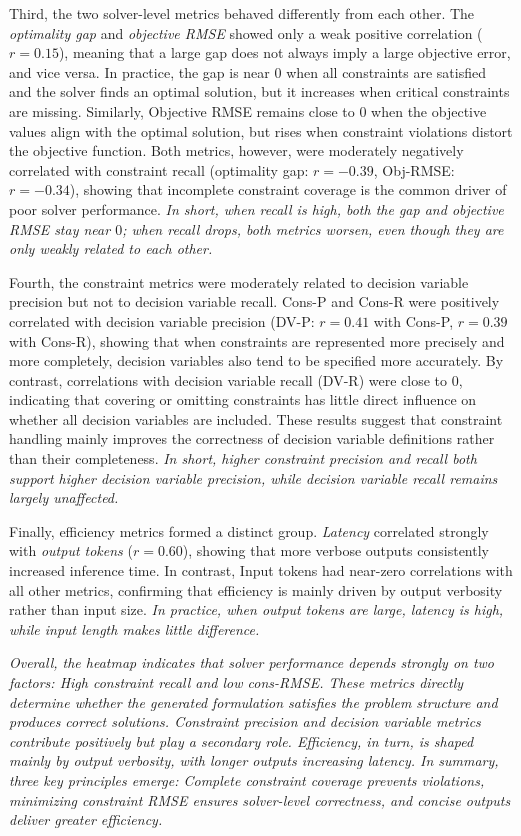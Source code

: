 \documentclass[review,12pt]{elsarticle}
\begin{document}
Third, the two solver-level metrics behaved differently from each other. The \emph{optimality gap} and \emph{objective RMSE} showed only a weak positive correlation ($r=0.15$), meaning that a large gap does not always imply a large objective error, and vice versa. In practice, the gap is near $0$ when all constraints are satisfied and the solver finds an optimal solution, but it increases when critical constraints are missing. Similarly, Objective RMSE remains close to $0$ when the objective values align with the optimal solution, but rises when constraint violations distort the objective function. Both metrics, however, were moderately negatively correlated with constraint recall (optimality gap: $r=-0.39$, Obj-RMSE: $r=-0.34$), showing that incomplete constraint coverage is the common driver of poor solver performance. \textit{In short, when recall is high, both the gap and objective RMSE stay near $0$; when recall drops, both metrics worsen, even though they are only weakly related to each other.}

Fourth, the constraint metrics were moderately related to decision variable precision but not to decision variable recall. Cons-P and Cons-R were positively correlated with decision variable precision (DV-P: $r=0.41$ with Cons-P, $r=0.39$ with Cons-R), showing that when constraints are represented more precisely and more completely, decision variables also tend to be specified more accurately. By contrast, correlations with decision variable recall (DV-R) were close to $0$, indicating that covering or omitting constraints has little direct influence on whether all decision variables are included. These results suggest that constraint handling mainly improves the correctness of decision variable definitions rather than their completeness. \textit{In short, higher constraint precision and recall both support higher decision variable precision, while decision variable recall remains largely unaffected.}


Finally, efficiency metrics formed a distinct group. \emph{Latency} correlated strongly with \emph{output tokens} ($r=0.60$), showing that more verbose outputs consistently increased inference time. In contrast, Input tokens had near-zero correlations with all other metrics, confirming that efficiency is mainly driven by output verbosity rather than input size. \textit{In practice, when output tokens are large, latency is high, while input length makes little difference.}

\textit{Overall, the heatmap indicates that solver performance depends strongly on two factors: High constraint recall and low cons-RMSE. These metrics directly determine whether the generated formulation satisfies the problem structure and produces correct solutions. Constraint precision and decision variable metrics contribute positively but play a secondary role. Efficiency, in turn, is shaped mainly by output verbosity, with longer outputs increasing latency. In summary, three key principles emerge: Complete constraint coverage prevents violations, minimizing constraint RMSE ensures solver-level correctness, and concise outputs deliver greater efficiency.}
\end{document}
